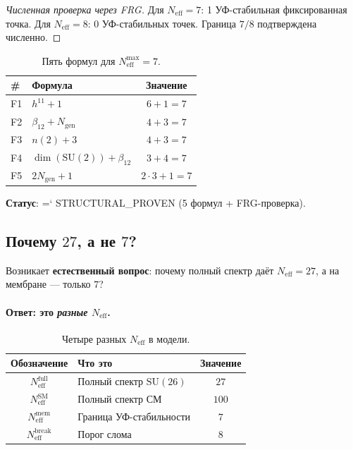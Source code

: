 \documentclass[11pt,a4paper]{article}
\newcommand{\SU}{\mathrm{SU}}
\newcommand{\Ngen}{N_{\text{gen}}}
\newcommand{\Neff}{N_{\text{eff}}}
\renewcommand{\texttt}[1]{{\ttfamily\hyphenchar\font=`\- #1}}
\theoremstyle{definition}
\begin{document}
\begin{proof}[Численная проверка через FRG]
Для $N_{\text{eff}} = 7$: 1 УФ-стабильная фиксированная точка.
Для $N_{\text{eff}} = 8$: 0 УФ-стабильных точек.
Граница $7/8$ подтверждена численно.
\end{proof}

\begin{table}[htbp]
\centering
\caption{Пять формул для $N_{\text{eff}}^{\max} = 7$.}
\label{tab:five-formulas-7}
\begin{tabular}{llc}
\toprule
\# & Формула & Значение \\
\midrule
F1 & $h^{11} + 1$ & $6 + 1 = 7$ \\
F2 & $\beta_{12} + \Ngen$ & $4 + 3 = 7$ \\
F3 & $n(2) + 3$ & $4 + 3 = 7$ \\
F4 & $\dim(\SU(2)) + \beta_{12}$ & $3 + 4 = 7$ \\
F5 & $2 \Ngen + 1$ & $2 \cdot 3 + 1 = 7$ \\
\bottomrule
\end{tabular}
\end{table}

\noindent
\textbf{Статус}: \texttt{STRUCTURAL\_PROVEN}
(5 формул + FRG-проверка).
\subsection{Почему $27$, а не $7$?}
\label{subsec:why-27-not-7}

Возникает \textbf{естественный вопрос}: почему полный спектр 
даёт $\Neff = 27$, а на мембране — только $7$?

\paragraph{Ответ: это \emph{разные} $N_{\text{eff}}$.}

\begin{table}[htbp]
\centering
\caption{Четыре разных $N_{\text{eff}}$ в модели.}
\label{tab:four-neff}
\begin{tabular}{clc}
\toprule
Обозначение & Что это & Значение \\
\midrule
$\Neff^{\text{full}}$ & Полный спектр $\SU(26)$ & $27$ \\
$\Neff^{\text{SM}}$ & Полный спектр СМ & $100$ \\
$\Neff^{\text{mem}}$ & Граница УФ-стабильности & $7$ \\
$\Neff^{\text{break}}$ & Порог слома & $8$ \\
\bottomrule
\end{tabular}
\end{table}
\end{document}
